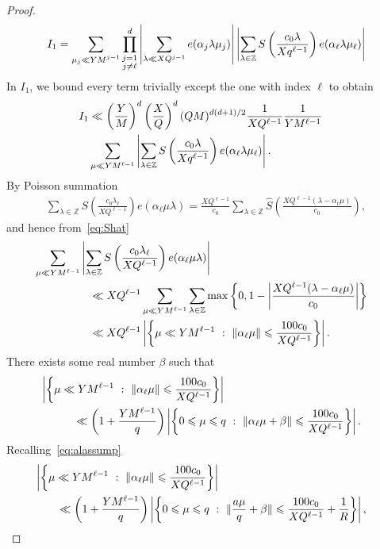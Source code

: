 \documentclass[12pt]{amsart}
\def\Z{{\mathbb Z}}
\def\\{\cr}
\def\le{\leqslant}
\begin{document}
\begin{proof}
\begin{align*}
I_1=\sum_{\substack{\mu_j \ll YM^{j-1}}}\prod_{\substack{j=1 \\ j\neq \ell }}^{d}\left|\sum_{\lambda \ll XQ^{j-1}}e(\alpha_j \lambda \mu_j)\right|\left|\sum_{\lambda \in \Z}S\left(\frac{c_0\lambda}{Xq^{\ell-1}}\right)e(\alpha_\ell \lambda \mu_\ell)\right|
\end{align*}
In $I_1$, we bound every term trivially except the one with index $\ell$ to obtain 
\begin{align}
\label{eq:I1I1}
I_1&\ll \left(\frac{Y}{M}\right)^{d}\left(\frac{X}{Q}\right)^{d}(QM)^{d(d+1)/2}\frac{1}{XQ^{\ell-1}}\frac{1}{YM^{\ell-1}} \\ &\sum_{\mu\ll YM^{\ell-1}}\left|\sum_{\lambda \in \Z}S\left(\frac{c_0\lambda}{Xq^{\ell-1}}\right)e(\alpha_\ell \lambda \mu_\ell)\right|.
\end{align}
By Poisson summation
\begin{align*}
\sum_{\lambda \in \Z}S\left(\frac{c_0\lambda_{\ell}}{XQ^{\ell-1}}\right)e(\alpha_\ell\mu \lambda)=\frac{XQ^{\ell-1}}{c_0}\sum_{\lambda \in \Z}\widehat S\left(\frac{XQ^{\ell-1}(\lambda-\alpha_{\ell}\mu)}{c_0}\right),
\end{align*}
and hence from~\eqref{eq:Shat}
\begin{align*}
&\sum_{\mu\ll YM^{\ell-1}}\left|\sum_{\lambda \in \Z}S\left(\frac{c_0\lambda_{\ell}}{XQ^{\ell-1}}\right)e(\alpha_\ell\mu \lambda)\right| \\ &  \quad \quad \quad \quad \quad \ll XQ^{\ell-1}\sum_{\mu\ll YM^{\ell-1}}\sum_{\lambda \in \Z}\max\left\{0,1-\left|\frac{XQ^{\ell-1}(\lambda-\alpha_{\ell}\mu)}{c_0} \right| \right\} \\ & 
\quad \quad \quad \quad \quad \ll XQ^{\ell-1}\left|\left\{ \mu \ll YM^{\ell-1} \ : \ \|\alpha_{\ell}\mu\|\le \frac{100c_0}{XQ^{\ell-1}} \right\}\right|.
\end{align*}
There exists some real number $\beta$ such that 
\begin{align*}
&\left|\left\{ \mu \ll YM^{\ell-1} \ : \ \|\alpha_{\ell}\mu\|\le \frac{100c_0}{XQ^{\ell-1}} \right\}\right| \\ & \quad \quad \quad \ll \left(1+\frac{YM^{\ell-1}}{q}\right)\left|\left\{ 0\le \mu \le q \ : \ \|\alpha_{\ell}\mu+\beta\|\le \frac{100c_0}{XQ^{\ell-1}} \right\}\right|.
\end{align*}
Recalling~\eqref{eq:alassump}
\begin{align*}
&\left|\left\{ \mu \ll YM^{\ell-1} \ : \ \|\alpha_{\ell}\mu\|\le \frac{100c_0}{XQ^{\ell-1}} \right\}\right| \\ &  \quad \quad \ll \left(1+\frac{YM^{\ell-1}}{q}\right)\left|\left\{ 0\le \mu \le q \ : \ \|\frac{a\mu}{q}+\beta\|\le \frac{100c_0}{XQ^{\ell-1}}+\frac{1}{R} \right\}\right|,

\end{align*}
\end{proof}
\end{document}

